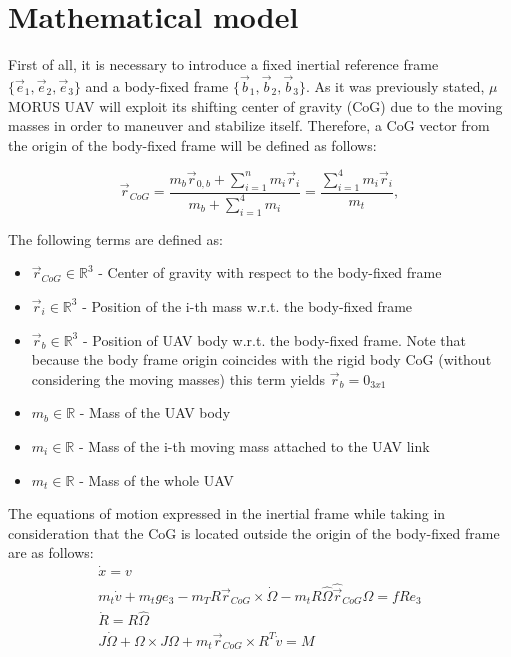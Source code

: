 \section{Mathematical model}

First of all, it is necessary to introduce a fixed inertial reference frame $\{ \vec{e}_1, \vec{e}_2, \vec{e}_3  \}$ and a body-fixed frame $ \{ \vec{b}_1, \vec{b}_2, \vec{b}_3 \}$. As it was previously stated, $\mu$MORUS UAV will exploit its shifting center of gravity (CoG) due to the moving masses in order to maneuver and stabilize itself. Therefore, a CoG vector from the origin of the body-fixed frame will be defined as follows:

\begin{equation}
	\vec{r}_{CoG} = \frac{m_{b}\vec{r}_{0,b} + \sum_{i=1}^n m_{i}\vec{r}_{i}}{m_{b} + \sum_{i=1}^4 m_{i}} = \frac{\sum_{i=1}^4 m_{i}\vec{r}_{i}}{m_t},
	\label{equ:cog}
\end{equation}

The following terms are defined as: 
\begin{itemize}
	\item $\vec{r}_{CoG} \in \mathbb{R}^3$ - Center of gravity with respect to the body-fixed frame
	
	\item $\vec{r}_{i} \in \mathbb{R}^3$ - Position of the i-th mass w.r.t. the body-fixed frame
	
	\item $\vec{r}_{b} \in \mathbb{R}^3$ - Position of UAV body w.r.t. the body-fixed frame. Note that because the body frame origin coincides with the rigid body CoG (without considering the moving masses) this term yields $\vec{r}_b = 0_{3x1}$
	
	\item $m_b \in \mathbb{R}$ - Mass of the UAV body 
	
	\item $m_i \in \mathbb{R}$ - Mass of the i-th moving mass attached to the UAV link
	
	\item $m_t \in \mathbb{R}$ - Mass of the whole UAV
\end{itemize}

The equations of motion expressed in the inertial frame while taking in consideration that the CoG is located outside the origin of the body-fixed frame are as follows\cite{LeeModel}: 
\begin{gather}
	\dot{x} = v \label{model1}\\
	m_t\dot{v} + m_tge_3 - m_TR \vec{r}_{CoG} \times \dot{\Omega} - m_tR\hat{\Omega}\hat{\vec{r}}_{CoG}\Omega = fRe_3 \label{model2} \\
	\dot{R} = R\hat{\Omega} \label{model3} \\
	J \dot{\Omega} + \Omega \times J \Omega + m_t \vec{r}_{CoG} \times R^T \dot{v} = M \label{model4}
\end{gather}

